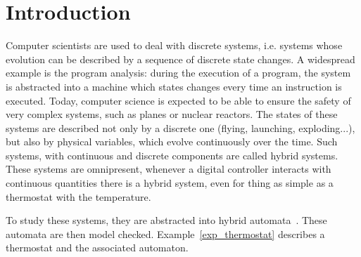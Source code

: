 \section{Introduction}
Computer scientists are used to deal with discrete systems, i.e. systems whose evolution can be described by a sequence of discrete state changes. A widespread example is the program analysis: during the execution of a program, the system is abstracted into a machine which states changes every time an instruction is executed.
Today, computer science is expected to be able to ensure the safety of very complex systems, such as planes or nuclear reactors. The states of these systems are described not only by a discrete one (flying, launching, exploding...), but also by physical variables, which evolve continuously over the time. Such systems, with continuous and discrete components are called hybrid systems. These systems are omnipresent, whenever a digital controller interacts with continuous quantities there is a hybrid system, even for thing as simple as a thermostat with the temperature.

To study these systems, they are abstracted into hybrid automata~\cite{colas}. These automata are then model checked. Example~\ref{exp_thermostat} describes a thermostat and the associated automaton.

